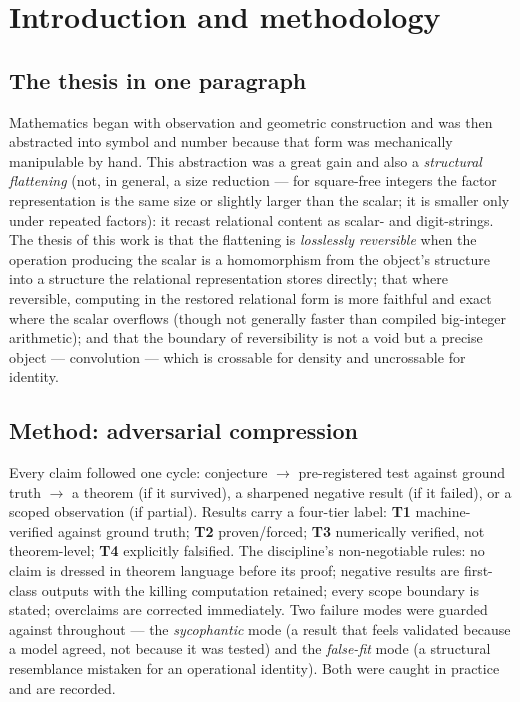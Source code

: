 \documentclass[11pt]{article}
\begin{document}
\tableofcontents
\newpage

\section{Introduction and methodology}

\subsection{The thesis in one paragraph}
Mathematics began with observation and geometric construction and was then abstracted into symbol and number
because that form was mechanically manipulable by hand. This abstraction was a great gain and also a
\emph{structural flattening} (not, in general, a size reduction --- for square-free integers the factor
representation is the same size or slightly larger than the scalar; it is smaller only under repeated
factors): it recast relational content as scalar- and digit-strings. The thesis of this work
is that the flattening is \emph{losslessly reversible} when the operation producing the scalar is a
homomorphism from the object's structure into a structure the relational representation stores directly; that
where reversible, computing in the restored relational form is more faithful and exact where the scalar
overflows (though not generally faster than compiled big-integer arithmetic); and
that the boundary of reversibility is not a void but a precise object --- convolution --- which is crossable
for density and uncrossable for identity.

\subsection{Method: adversarial compression}
Every claim followed one cycle: conjecture $\to$ pre-registered test against ground truth $\to$ a theorem
(if it survived), a sharpened negative result (if it failed), or a scoped observation (if partial). Results
carry a four-tier label: \textbf{T1} machine-verified against ground truth; \textbf{T2} proven/forced;
\textbf{T3} numerically verified, not theorem-level; \textbf{T4} explicitly falsified. The discipline's
non-negotiable rules: no claim is dressed in theorem language before its proof; negative results are
first-class outputs with the killing computation retained; every scope boundary is stated; overclaims are
corrected immediately. Two failure modes were guarded against throughout --- the \emph{sycophantic} mode (a
result that feels validated because a model agreed, not because it was tested) and the \emph{false-fit} mode
(a structural resemblance mistaken for an operational identity). Both were caught in practice and are
recorded.
\end{document}
